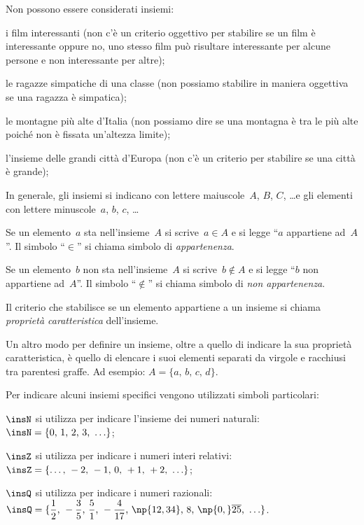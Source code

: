 Non possono essere considerati insiemi:
\begin{itemize*}
 \item i film interessanti (non c'è un criterio oggettivo per stabilire se un film è interessante oppure no, uno stesso film
può risultare interessante per alcune persone e non interessante per altre);
 \item le ragazze simpatiche di una classe (non possiamo stabilire in maniera oggettiva se una ragazza è simpatica);
 \item le montagne più alte d'Italia (non possiamo dire se una montagna è tra le più alte poiché non è fissata
un'altezza limite);
 \item l'insieme delle grandi città d'Europa (non c'è un criterio per
stabilire se una città è grande);
\end{itemize*}

\ovalbox{\risolvi \ref{ese:\thechapter.1}}\vspazio


In generale, gli insiemi si indicano con lettere maiuscole~$A$, $B$, $C$, \ldots e
gli elementi con lettere minuscole~$a$, $b$, $c$, \ldots

Se un elemento~$a$ sta nell'insieme~$A$ si scrive~$a\in A$ e si legge ``$a$ appartiene ad~$A$''.
Il simbolo ``$\in$'' si chiama simbolo di \textit{appartenenza}.

Se un elemento~$b$ non sta nell'insieme~$A$ si scrive~$b\notin A$ e
si legge ``$b$ non appartiene ad~$A$''. Il simbolo ``$\notin$''
si chiama simbolo di \textit{non appartenenza}.

Il criterio che stabilisce se un elemento appartiene a un insieme si chiama \textit{proprietà caratteristica} dell'insieme.

Un altro modo per definire un insieme, oltre a quello di indicare la sua proprietà caratteristica, è quello di elencare i suoi elementi separati da virgole e racchiusi tra parentesi graffe. Ad esempio: $A=\{a\text{, }b\text{, }c\text{, }d\}$.

Per indicare alcuni insiemi specifici vengono utilizzati simboli particolari:
\begin{itemize*}
 \item $\insN$ si utilizza per indicare l'insieme dei numeri naturali:~$\insN=\{0\text{, }1\text{, }2\text{, }3\text{, }\ldots\}$;
 \item $\insZ$ si utilizza per indicare i numeri interi relativi:~$\insZ=\{\ldots\text{, }-2\text{, }-1\text{, }0\text{, }+1\text{, }+2\text{, }\ldots\}$;
 \item $\insQ$ si utilizza per indicare i numeri razionali:~$\insQ=\{\dfrac{1}{2}\text{, }-\dfrac{3}{5}\text{, }\dfrac{5}{1}\text{, }-\dfrac{4}{17}\text{, }\np{12,34}\text{, }8\text{, }\np{0,}\overline{25}\text{, }\ldots\}$.
 \end{itemize*}


